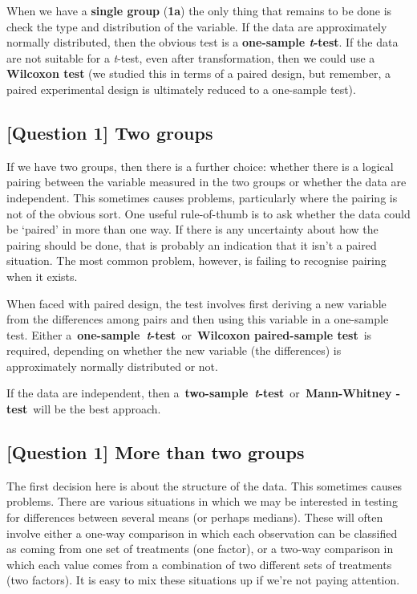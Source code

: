 \documentclass[
]{book}
\begin{document}
When we have a \textbf{single group} (\textbf{1a}) the only thing that remains to be done is check the type and distribution of the variable. If the data are approximately normally distributed, then the obvious test is a \textbf{one-sample \emph{t}-test}. If the data are not suitable for a \emph{t}-test, even after transformation, then we could use a \textbf{Wilcoxon test} (we studied this in terms of a paired design, but remember, a paired experimental design is ultimately reduced to a one-sample test).

\hypertarget{question-1-two-groups}{%
\subsection{{[}Question 1{]} Two groups}\label{question-1-two-groups}}

If we have two groups, then there is a further choice: whether there is a logical pairing between the variable measured in the two groups or whether the data are independent. This sometimes causes problems, particularly where the pairing is not of the obvious sort. One useful rule-of-thumb is to ask whether the data could be `paired' in more than one way. If there is any uncertainty about how the pairing should be done, that is probably an indication that it isn't a paired situation. The most common problem, however, is failing to recognise pairing when it exists.

When faced with paired design, the test involves first deriving a new variable from the differences among pairs and then using this variable in a one-sample test. Either a~\textbf{one-sample~\emph{t}-test}~or~\textbf{Wilcoxon paired-sample test}~is required, depending on whether the new variable (the differences) is approximately normally distributed or not.

If the data are independent, then a~\textbf{two-sample~\emph{t}-test}~or~\textbf{Mann-Whitney -test}~will be the best approach.

\hypertarget{question-1-more-than-two-groups}{%
\subsection{{[}Question 1{]} More than two groups}\label{question-1-more-than-two-groups}}

The first decision here is about the structure of the data. This sometimes causes problems. There are various situations in which we may be interested in testing for differences between several means (or perhaps medians). These will often involve either a one-way comparison in which each observation can be classified as coming from one set of treatments (one factor), or a two-way comparison in which each value comes from a combination of two different sets of treatments (two factors). It is easy to mix these situations up if we're not paying attention.
\end{document}
